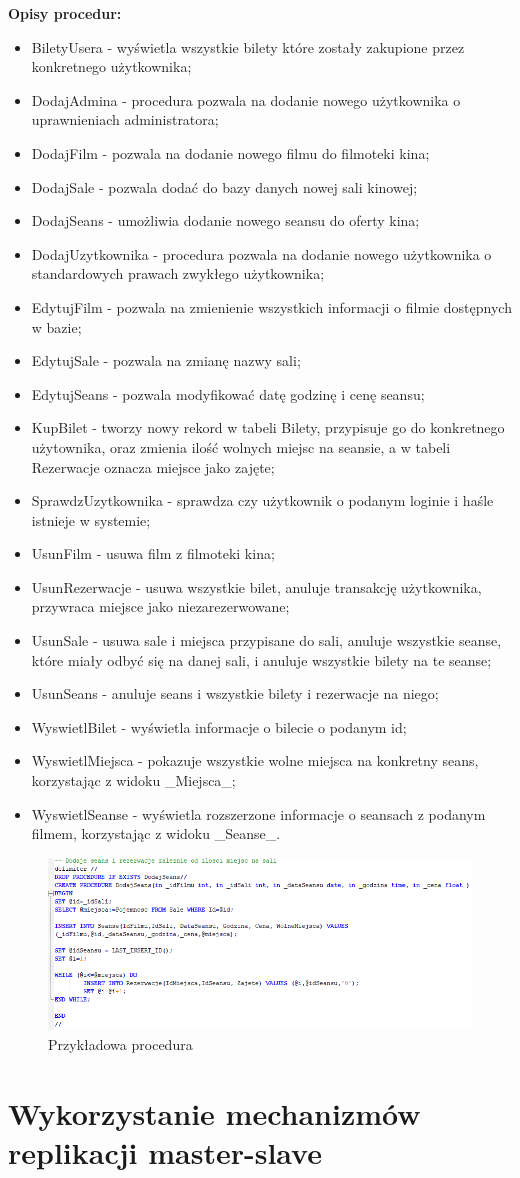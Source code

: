 \textbf{Opisy procedur:}
\begin{itemize}
	\item BiletyUsera - wyświetla wszystkie bilety które zostały zakupione przez konkretnego użytkownika;
	\item DodajAdmina - procedura pozwala na dodanie nowego użytkownika o uprawnieniach administratora;
	\item DodajFilm - pozwala na dodanie nowego filmu do filmoteki kina;
	\item DodajSale - pozwala dodać do bazy danych nowej sali kinowej;
	\item DodajSeans - umożliwia dodanie nowego seansu do oferty kina;
	\item DodajUzytkownika - procedura pozwala na dodanie nowego użytkownika o standardowych prawach zwykłego użytkownika;
	\item EdytujFilm - pozwala na zmienienie wszystkich informacji o filmie dostępnych w bazie;
	\item EdytujSale - pozwala na zmianę nazwy sali;
	\item EdytujSeans - pozwala modyfikować datę godzinę i cenę seansu;
	\item KupBilet - tworzy nowy rekord w tabeli Bilety, przypisuje go do konkretnego użytownika, oraz zmienia ilość wolnych miejsc na seansie, a w tabeli Rezerwacje oznacza miejsce jako zajęte;
	\item SprawdzUzytkownika - sprawdza czy użytkownik o podanym loginie i haśle istnieje w systemie;
	\item UsunFilm - usuwa film z filmoteki kina;
	\item UsunRezerwacje - usuwa wszystkie bilet, anuluje transakcję użytkownika, przywraca miejsce jako niezarezerwowane;
	\item UsunSale - usuwa sale i miejsca przypisane do sali, anuluje wszystkie seanse, które miały odbyć się na danej sali, i anuluje wszystkie bilety na te seanse;
	\item UsunSeans - anuluje seans i wszystkie bilety i rezerwacje na niego;
	\item WyswietlBilet - wyświetla informacje o bilecie o podanym id;
	\item WyswietlMiejsca - pokazuje wszystkie wolne miejsca na konkretny seans, korzystając z widoku \_Miejsca\_;
	\item WyswietlSeanse - wyświetla rozszerzone informacje o seansach z podanym filmem, korzystając z widoku \_Seanse\_.
\end{itemize}

\begin{figure} [H]
	\centering
	\includegraphics[width=1\linewidth]{rozdzial04/P_DodajSeans.png}
	\caption{Przykładowa procedura}
	\label{fig:p_DodajSeans}
\end{figure}

\section{Wykorzystanie mechanizmów replikacji master-slave}
